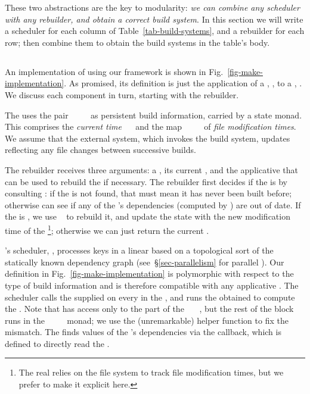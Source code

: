 These two abstractions are the key to modularity: \emph{we can combine any
scheduler with any rebuilder, and obtain a correct build system}.
In this section we will write a scheduler for each column of
Table~\ref{tab-build-systems}, and a rebuilder for each row; then combine them
to obtain the build systems in the table's body.

\subsection{\Make}\label{sec-implementation-make}

An implementation of \Make using our framework is shown in
Fig.~\ref{fig-make-implementation}. As promised, its definition
is just the application of a , ,
to a , .
We discuss each component in turn, starting with the rebuilder.

The  uses the pair
~~\hs{=}~~ as persistent
build information, carried by a state monad. This  comprises
the \emph{current time} ~\hs{::}~ and the map
~\hs{::}~~~ of \emph{file modification
times}. We assume that the external system, which invokes the build system,
updates  reflecting any file changes between successive builds.

The rebuilder receives three arguments: a , its current , and
the applicative  that can be used to rebuild the  if necessary.
The rebuilder first decides if the  is  by consulting
: if the  is not found, that must mean it has never been
built before; otherwise  can see if any of the 's
dependencies (computed by ) are out of date. If the  is
, we use ~ to rebuild it, and update the state with
the new modification time of the \footnote{The real \Make
relies on the file system to track file modification times, but we prefer
to make it explicit here.}; otherwise we can just return the current .

\Make's scheduler, , processes keys in a linear  based
on a topological sort of the statically known dependency graph
(see~\S\ref{sec-parallelism} for parallel \Make). Our definition in
Fig.~\ref{fig-make-implementation} is polymorphic with respect to the type of
build information  and is therefore compatible with any applicative
. The scheduler calls the supplied  on every
 in the , and runs the obtained  to compute the
. Note that  has access only to the  part of the
~~~, but the rest of the  block runs in the
~~~~ monad; we use the (unremarkable)
helper function  to fix the mismatch. The  finds
values of the 's dependencies via the  callback, which is
defined to directly read the .

